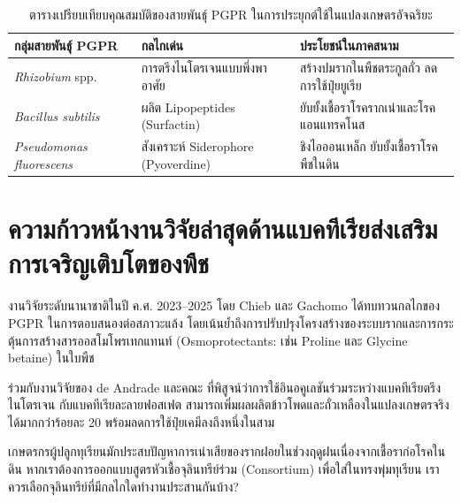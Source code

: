 \begin{table}[ht]
\centering
\small
\begin{tabular}{lp{3.8cm}p{4.5cm}}
\toprule
\textbf{กลุ่มสายพันธุ์ PGPR} & \textbf{กลไกเด่น} & \textbf{ประโยชน์ในภาคสนาม} \\
\midrule
\textit{Rhizobium} spp. & การตรึงไนโตรเจนแบบพึ่งพาอาศัย & สร้างปมรากในพืชตระกูลถั่ว ลดการใช้ปุ๋ยยูเรีย \\
\textit{Bacillus subtilis} & ผลิต Lipopeptides (Surfactin) & ยับยั้งเชื้อราโรครากเน่าและโรคแอนแทรคโนส \\
\textit{Pseudomonas fluorescens} & สังเคราะห์ Siderophore (Pyoverdine) & ชิงไอออนเหล็ก ยับยั้งเชื้อราโรคพืชในดิน \\
\bottomrule
\end{tabular}
\caption{ตารางเปรียบเทียบคุณสมบัติของสายพันธุ์ PGPR ในการประยุกต์ใช้ในแปลงเกษตรอัจฉริยะ}
\label{tab:pgpr_strains}
\end{table}

\section{ความก้าวหน้างานวิจัยล่าสุดด้านแบคทีเรียส่งเสริมการเจริญเติบโตของพืช}

งานวิจัยระดับนานาชาติในปี ค.ศ. 2023–2025 โดย Chieb และ Gachomo \cite{pmid37626328} ได้ทบทวนกลไกของ PGPR ในการตอบสนองต่อสภาวะแล้ง โดยเน้นย้ำถึงการปรับปรุงโครงสร้างของระบบรากและการกระตุ้นการสร้างสารออสโมโพรเทกแทนท์ (Osmoprotectants: เช่น Proline และ Glycine betaine) ในใบพืช 

ร่วมกับงานวิจัยของ de Andrade และคณะ \cite{pmid37110511} ที่พิสูจน์ว่าการใช้อินอคูเลชันร่วมระหว่างแบคทีเรียตรึงไนโตรเจน  กับแบคทีเรียละลายฟอสเฟต  สามารถเพิ่มผลผลิตข้าวโพดและถั่วเหลืองในแปลงเกษตรจริงได้มากกว่าร้อยละ 20 พร้อมลดการใช้ปุ๋ยเคมีลงถึงหนึ่งในสาม

\begin{insight}
เกษตรกรผู้ปลูกทุเรียนมักประสบปัญหาการเน่าเสียของรากฝอยในช่วงฤดูฝนเนื่องจากเชื้อราก่อโรคในดิน หากเราต้องการออกแบบสูตรหัวเชื้อจุลินทรีย์ร่วม (Consortium) เพื่อใส่ในทรงพุ่มทุเรียน เราควรเลือกจุลินทรีย์ที่มีกลไกใดทำงานประสานกันบ้าง?
\end{insight}

